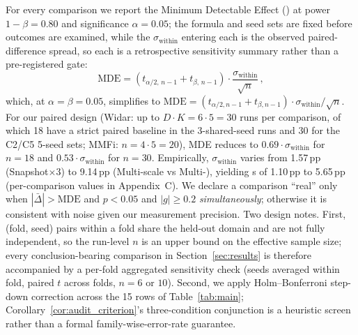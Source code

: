 \documentclass[11pt]{article}
\theoremstyle{definition}
\newcommand{\MDE}{\text{MDE}}
\newcommand{\Rx}{\text{Rx}}
\begin{document}
For every comparison we report the Minimum Detectable Effect (\MDE) at power $1 - \beta = 0.80$ and significance $\alpha = 0.05$; the formula and seed sets are fixed before outcomes are examined, while the $\sigma_{\text{within}}$ entering each \MDE{} is the observed paired-difference spread, so each \MDE{} is a retrospective sensitivity summary rather than a pre-registered gate:
\begin{equation}
    \MDE{} = (t_{\alpha/2,\,n-1} + t_{\beta,\,n-1}) \cdot \frac{\sigma_{\text{within}}}{\sqrt{n}}\,,
    \label{eq:mde}
\end{equation}
which, at $\alpha = \beta = 0.05$, simplifies to $\MDE{} = (t_{\alpha/2,n-1} + t_{\beta,n-1}) \cdot \sigma_{\text{within}} / \sqrt{n}$. For our paired design (Widar: up to $D \cdot K = 6 \cdot 5 = 30$ runs per comparison, of which 18 have a strict paired baseline in the 3-shared-seed runs and 30 for the C2/C5 5-seed sets; MMFi: $n = 4 \cdot 5 = 20$), MDE reduces to $0.69 \cdot \sigma_{\text{within}}$ for $n = 18$ and $0.53 \cdot \sigma_{\text{within}}$ for $n = 30$. Empirically, $\sigma_{\text{within}}$ varies from 1.57\,pp (Snapshot$\times$3) to 9.14\,pp (Multi-scale vs Multi-\Rx), yielding \MDE{}s of 1.10\,pp to 5.65\,pp (per-comparison values in Appendix~C). We declare a comparison ``real'' only when $|\bar{\Delta}| > \MDE$ and $p < 0.05$ and $|g| \geq 0.2$ \emph{simultaneously}; otherwise it is consistent with noise given our measurement precision. Two design notes. First, (fold, seed) pairs within a fold share the held-out domain and are not fully independent, so the run-level $n$ is an upper bound on the effective sample size; every conclusion-bearing comparison in Section~\ref{sec:results} is therefore accompanied by a per-fold aggregated sensitivity check (seeds averaged within fold, paired $t$ across folds, $n = 6$ or $10$). Second, we apply Holm--Bonferroni step-down correction across the 15 rows of Table~\ref{tab:main}; Corollary~\ref{cor:audit_criterion}'s three-condition conjunction is a heuristic screen rather than a formal family-wise-error-rate guarantee.
\end{document}
